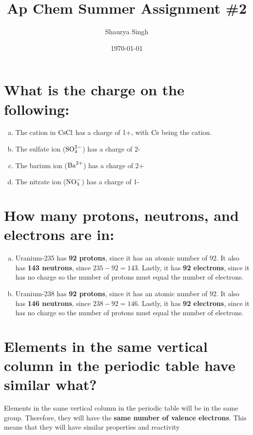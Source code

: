 \documentclass{scrartcl}
\author{Shaurya Singh}
\date{\today}
\title{Ap Chem Summer Assignment \#2}
\begin{document}
\maketitle

\section{What is the charge on the following:}
\label{sec:orgba6e02f}
\begin{enumerate}[(a)]
\item The cation in \(\ce{CsCl}\) has a charge of 1+, with \(\ce{Cs}\) being the cation.
\item The sulfate ion (\(\ce{SO^{2-}4}\)) has a charge of 2-
\item The barium ion (\(\ce{Ba^{2+}}\)) has a charge of 2+
\item The nitrate ion (\(\ce{NO^-3}\)) has a charge of 1-
\end{enumerate}

\section{How many protons, neutrons, and electrons are in:}
\label{sec:orgeb5944e}
\begin{enumerate}[(a)]
\item Uranium-235 has \textbf{92 protons}, since it has an atomic number of 92. It also has \textbf{143 neutrons}, since \(235-92=143\). Lastly, it has \textbf{92 electrons}, since it has no charge so the number of protons must equal the number of electrons.
\item Uranium-238 has \textbf{92 protons}, since it has an atomic number of 92. It also has \textbf{146 neutrons}, since \(238-92=146\). Lastly, it has \textbf{92 electrons}, since it has no charge so the number of protons must equal the number of electrons.
\end{enumerate}

\section{Elements in the same vertical column in the periodic table have similar what?}
\label{sec:org52e5dca}
Elements in the same vertical column in the periodic table will be in the same
group. Therefore, they will have the \textbf{same number of valence electrons}. This
means that they will have similar properties and reactivity
\end{document}
